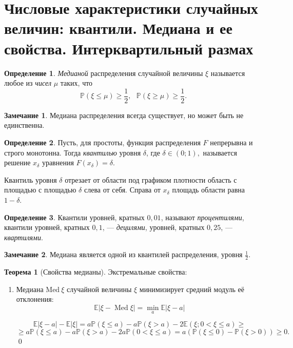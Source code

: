 \documentclass[oneside,final,14pt]{extreport}
\newcommand\myprob[1]{{\mathbb{P}(#1)}}
\renewenvironment{proof}{{\bfseries Доказательство.}}{\qed}
\theoremstyle{plain}
\theoremstyle{definition}
\newtheorem*{defn}{Определение}
\newtheorem*{rmrk}{Замечание}
\theoremstyle{named}
\newtheorem*{namedthm}{Теорема}
\begin{document}
\section {Числовые характеристики случайных величин: квантили. Медиана и ее свойства. Интерквартильный размах}

\begin{defn}
    {\it Медианой} распределения случайной величины $\xi$ называется любое из {\it чисел} $\mu$ таких, что
$$\myprob{\xi \leqslant \mu} \geqslant \frac{1}{2}, ~~~ \myprob{\xi \geqslant \mu} \geqslant \frac{1}{2}.$$
\end{defn} 

\begin{rmrk}
    Медиана распределения всегда существует, но может быть не единственна.
\end{rmrk} 

\begin{defn}
    Пусть, для простоты, функция распределения $F$ непрерывна и строго монотонна. Тогда {\it квантилью} уровня $\delta$, где $\delta \in (0; 1), $ называется решение $x_\delta$ уравнения $F(x_\delta) = \delta.$ 
\end{defn} 

Квантиль уровня $\delta$ отрезает от области под графиком плотности область с площадью с площадью $\delta$ слева от себя. Справа от $x_\delta$ площадь области равна $1 - \delta$.

\begin{defn}
    Квантили уровней, кратных $0,01$, называют {\it процентилями}, квантили уровней, кратных $0,1$, — {\it децилями}, уровней, кратных $0,25$, — {\it квартилями}.
\end{defn} 

\begin{rmrk}
    Медиана является одной из квантилей распределения, уровня $\frac{1}{2}.$
\end{rmrk} 

\begin{namedthm}[Свойства медианы]

Экстремальные свойства:

\begin{enumerate}
    \item Медиана $\mathrm{Med}~\xi$ случайной величины $\xi$ минимизирует средний модуль её отклонения:
    $$\mathbb{E}|\xi-\operatorname{Med} \xi|=\min _{a} \mathbb{E}|\xi-a|$$
    
    \begin{proof}
        $$\mathbb{E}|\xi - a| - \mathbb{E}|\xi| = a\myprob{\xi \leqslant a} - a\myprob{\xi > a} - 2\mathbb{E}(\xi; 0 < \xi \leqslant a) \geqslant$$ $$\geqslant a\myprob{\xi \leqslant a} - a\myprob{\xi > a} - 2a\myprob{0 < \xi \leqslant a} = a(\myprob{\xi \leqslant 0} - \myprob{\xi > 0}) \geqslant 0.$$
    \end{proof}
\end{enumerate}

\end{namedthm}
\end{document}
